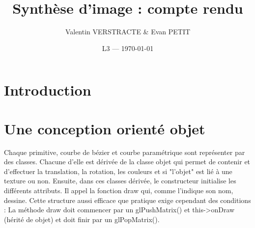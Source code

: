 \documentclass{article}
\title{Synthèse d'image : compte rendu} %
\author{Valentin VERSTRACTE \& Evan PETIT}
\date{L3 --- \today} %
\begin{document}
\maketitle %


\section*{Introduction} %


\section{Une conception orienté objet} %

Chaque primitive, courbe de bézier et courbe paramétrique sont représenter par des classes. Chacune d'elle est dérivée de la classe objet qui permet de contenir et d'effectuer la translation, la rotation, les couleurs et si "l'objet" est lié à une texture ou non. Ensuite, dans ces classes dérivée, le constructeur initialise les différents attributs. Il appel la fonction draw qui, comme l'indique son nom, dessine. Cette structure aussi efficace que pratique exige cependant des conditions : La méthode draw doit commencer par un glPushMatrix() et this->onDraw (hérité de objet) et doit finir par un glPopMatrix().
\end{document}
